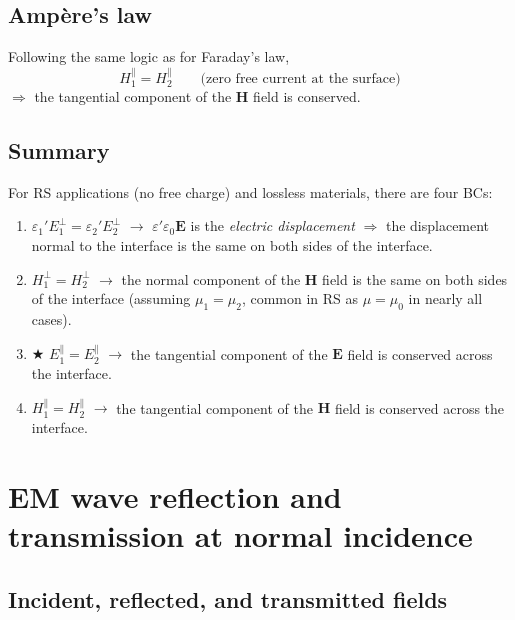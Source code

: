 \documentclass[11pt, oneside]{article}
\begin{document}
\subsection{Amp\`ere's law}

Following the same logic as for Faraday's law,
\begin{equation}
	\boxed{H_1^\parallel = H_2^\parallel} \qquad \text{(zero free current at the surface)}
\end{equation}
$\Rightarrow$ the tangential component of the $\mathbf{H}$ field is conserved.

\subsection{Summary}

For RS applications (no free charge) and lossless materials, there are four BCs:
\begin{enumerate}
	\item $\varepsilon_1'E_1^\perp = \varepsilon_2'E_2^\perp$ $\rightarrow$ $\varepsilon'\varepsilon_0\mathbf{E}$ is the \emph{electric displacement} $\Rightarrow$ the displacement normal to the interface is the same on both sides of the interface.
	\item $H_1^\perp = H_2^\perp$ $\rightarrow$ the normal component of the $\mathbf{H}$ field is the same on both sides of the interface (assuming $\mu_1 = \mu_2$, common in RS as $\mu = \mu_0$ in nearly all cases).
	\item $\bigstar$ $E_1^\parallel = E_2^\parallel$ $\rightarrow$ the tangential component of the $\mathbf{E}$ field is conserved across the interface.
	\item $H_1^\parallel = H_2^\parallel$ $\rightarrow$ the tangential component of the $\mathbf{H}$ field is conserved across the interface.
\end{enumerate}

\section{EM wave reflection and transmission at normal incidence}

\subsection{Incident, reflected, and transmitted fields}
\end{document}
